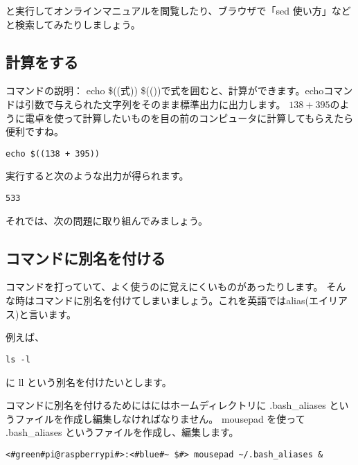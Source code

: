 と実行してオンラインマニュアルを閲覧したり、ブラウザで「sed 使い方」などと検索してみたりしましょう。

\subsection{計算をする}

コマンドの説明： echo \$((式))
\$(())で式を囲むと、計算ができます。echoコマンドは引数で与えられた文字列をそのまま標準出力に出力します。
$138 + 395$のように電卓を使って計算したいものを目の前のコンピュータに計算してもらえたら便利ですね。

\begin{lstlisting}[caption=echo コマンドを使った例, label=echo]
echo $((138 + 395))
\end{lstlisting}

実行すると次のような出力が得られます。

\begin{lstlisting}[caption=echo コマンドを実行した結果, label=echo_result]
533
\end{lstlisting}

それでは、次の問題に取り組んでみましょう。

\begin{enumerate}
\end{enumerate}

\subsection{コマンドに別名を付ける}

コマンドを打っていて、よく使うのに覚えにくいものがあったりします。
そんな時はコマンドに別名を付けてしまいましょう。これを英語ではalias(エイリアス)と言います。

例えば、

\begin{lstlisting}[caption=lsコマンド, label=lsAlias]
    ls -l
\end{lstlisting}

に ll という別名を付けたいとします。

コマンドに別名を付けるためにはにはホームディレクトリに .bash{\_}aliases というファイルを作成し編集しなければなりません。
mousepad を使って .bash{\_}aliases というファイルを作成し、編集します。
\begin{lstlisting}[caption=.bashaliasesを開く, label=openBashAliases]
    <#green#pi@raspberrypi#>:<#blue#~ $#> mousepad ~/.bash_aliases &
\end{lstlisting}

